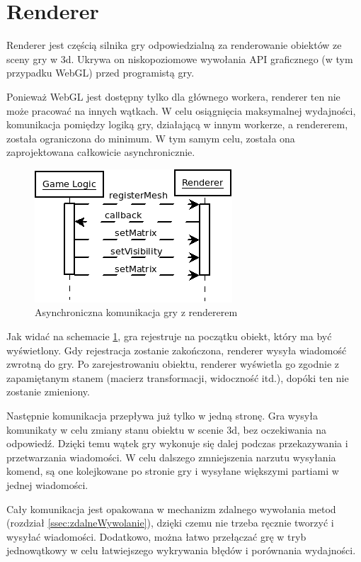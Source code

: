 \section{Renderer}
\label{sec:renderer}

Renderer jest częścią silnika gry odpowiedzialną za renderowanie obiektów ze sceny gry w 3d.
Ukrywa on niskopoziomowe wywołania API graficznego (w tym przypadku WebGL) przed programistą gry.

Ponieważ WebGL jest dostępny tylko dla głównego workera, renderer ten nie może pracować na innych wątkach.
W celu osiągnięcia maksymalnej wydajności, komunikacja pomiędzy logiką gry, działającą w innym workerze,
a rendererem, została ograniczona do minimum. W tym samym celu, została ona zaprojektowana całkowicie
asynchronicznie.

\begin{figure}[h!]
  \centering
  \includegraphics[scale=1]{zasoby/rozdzial31/renderer-messages}  
  \caption{Asynchroniczna komunikacja gry z rendererem}
  \label{fig:renderer-messages}
\end{figure}

Jak widać na schemacie \ref{fig:renderer-messages}, gra rejestruje na początku obiekt, który ma
być wyświetlony. Gdy rejestracja zostanie zakończona, renderer wysyła wiadomość zwrotną do gry.
Po zarejestrowaniu obiektu, renderer wyświetla go zgodnie z zapamiętanym stanem (macierz
transformacji, widoczność itd.), dopóki ten nie zostanie zmieniony.

Następnie komunikacja przepływa już tylko w jedną stronę. Gra wysyła komunikaty w celu zmiany
stanu obiektu w scenie 3d, bez oczekiwania na odpowiedź. Dzięki temu wątek gry wykonuje się
dalej podczas przekazywania i przetwarzania wiadomości. W celu dalszego zmniejszenia
narzutu wysyłania komend, są one kolejkowane po stronie gry i wysyłane większymi partiami
w jednej wiadomości.

Cały komunikacja jest opakowana w mechanizm zdalnego wywołania metod (rozdział \ref{ssec:zdalneWywolanie}),
dzięki czemu nie trzeba ręcznie tworzyć i wysyłać wiadomości. Dodatkowo, można łatwo przełączać
grę w tryb jednowątkowy w celu łatwiejszego wykrywania błędów i porównania wydajności.

